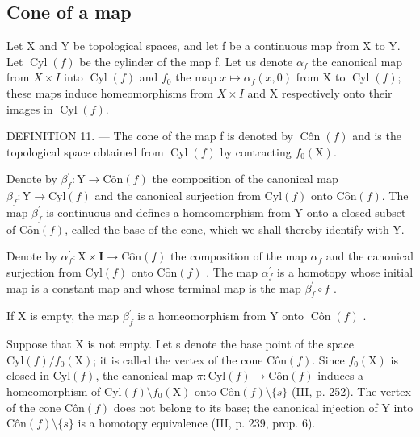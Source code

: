 \subsection{Cone of a map}

Let X and Y be topological spaces, and let f be a continuous map from X to Y. Let \(\operatorname{Cyl}(f)\) be the cylinder of the map f. Let us denote \(\alpha_{f}\) the canonical map from \(X \times I\) into \(\operatorname{Cyl}(f)\) and \(f_{0}\) the map \(x \mapsto \alpha_{f}(x,0)\) from X to \(\operatorname{Cyl}(f)\); these maps induce homeomorphisms from \(X \times I\) and X respectively onto their images in \(\operatorname{Cyl}(f)\).

DEFINITION 11. --- The cone of the map f is denoted by \(\operatorname{Côn}(f)\) and is the topological space obtained from \(\operatorname{Cyl}(f)\) by contracting \(f_{0}(\mathrm{X})\).

Denote by \(\beta_{f}^{\prime}\colon\mathrm{Y}\to\mathrm{C}\hat{\mathrm{o}}\mathrm{n}(f)\) the composition of the canonical map \(\beta_{f}\colon\mathrm{Y}\to\mathrm{C}\mathrm{y}\mathrm{l}(f)\) and the canonical surjection from \(\mathrm{C}\mathrm{y}\mathrm{l}(f)\) onto \(\mathrm{C}\hat{\mathrm{o}}\mathrm{n}(f)\). The map \(\beta_{f}^{\prime}\) is continuous and defines a homeomorphism from Y onto a closed subset of \(\mathrm{C}\hat{\mathrm{o}}\mathrm{n}(f)\), called the base of the cone, which we shall thereby identify with Y.

Denote by \(\alpha_{f}^{\prime}\colon\mathrm{X}\times\mathbf{I}\to\mathrm{C}\hat{\mathrm{o}}\mathrm{n}(f)\) the composition of the map \(\alpha_{f}\) and the canonical surjection from \(\mathrm{Cyl}(f)\) onto \(\mathrm{C}\hat{\mathrm{o}}\mathrm{n}(f)\) . The map \(\alpha_{f}^{\prime}\) is a homotopy whose initial map is a constant map and whose terminal map is the map \(\beta_{f}^{\prime}\circ f\) .

If X is empty, the map \(\beta_{f}^{\prime}\) is a homeomorphism from Y onto \(\operatorname{Côn}(f)\) .

Suppose that X is not empty. Let s denote the base point of the space \(\mathrm{Cyl}(f)/f_{0}(\mathrm{X})\); it is called the vertex of the cone \(\mathrm{Côn}(f)\). Since \(f_{0}(\mathrm{X})\) is closed in \(\mathrm{Cyl}(f)\), the canonical map \(\pi\colon\mathrm{Cyl}(f)\to\mathrm{Côn}(f)\) induces a homeomorphism of \(\mathrm{Cyl}(f)\setminus f_{0}(\mathrm{X})\) onto \(\mathrm{Côn}(f)\setminus\{s\}\) (III, p. 252). The vertex of the cone \(\mathrm{Côn}(f)\) does not belong to its base; the canonical injection of Y into \(\mathrm{Côn}(f)\setminus\{s\}\) is a homotopy equivalence (III, p. 239, prop. 6).

